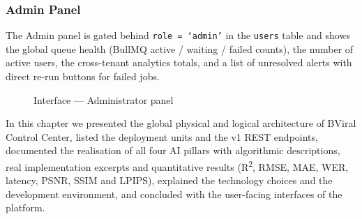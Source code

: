 \subsubsection{Admin Panel}
\label{sec:ui_admin}
The Admin panel is gated behind \texttt{role = `admin'} in the \texttt{users} table and
shows the global queue health (BullMQ active / waiting / failed counts), the number of
active users, the cross-tenant analytics totals, and a list of unresolved alerts with
direct re-run buttons for failed jobs.

\begin{figure}[H]
  \centering
  \caption{Interface --- Administrator panel}
  \label{fig:ui_admin}
\end{figure}

\chapconclusion
In this chapter we presented the global physical and logical architecture of BViral Control
Center, listed the deployment units and the v1 REST endpoints, documented the realisation
of all four AI pillars with algorithmic descriptions, real implementation excerpts and
quantitative results (R\textsuperscript{2}, RMSE, MAE, WER, latency, PSNR, SSIM and LPIPS),
explained the technology choices and the development environment, and concluded with the
user-facing interfaces of the platform.

\cleardoublepage
